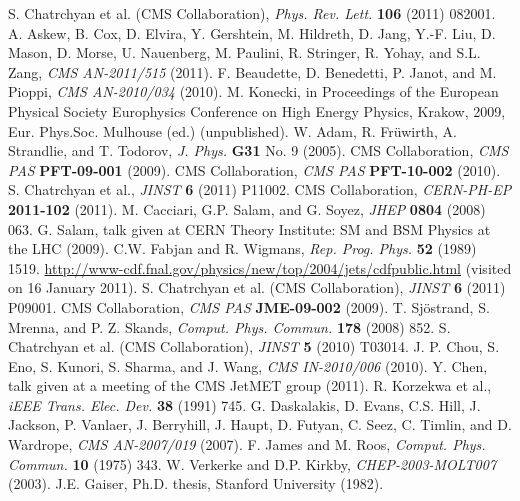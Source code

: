 \documentclass[12pt, letterpaper]{report}
\begin{document}
\begin{thebibliography}{99}
 S. Chatrchyan et al. (CMS Collaboration), \textit{Phys. Rev. Lett.} \textbf{106} (2011) 082001.
 A. Askew, B. Cox, D. Elvira, Y. Gershtein, M. Hildreth, D. Jang, Y.-F. Liu, D. Mason, D. Morse, U. Nauenberg, M. Paulini, R. Stringer, R. Yohay, and S.L. Zang, \textit{CMS AN-2011/515} (2011).
 F. Beaudette, D. Benedetti, P. Janot, and M. Pioppi, \textit{CMS AN-2010/034} (2010).
 M. Konecki, in Proceedings of the European Physical Society  Europhysics Conference on High Energy Physics, Krakow, 2009, Eur. Phys.Soc. Mulhouse (ed.) (unpublished).
 W. Adam, R. Fr\"uwirth, A. Strandlie, and T. Todorov, \textit{J. Phys.} \textbf{G31} No. 9 (2005).
 CMS Collaboration, \textit{CMS PAS} \textbf{PFT-09-001} (2009).
 CMS Collaboration, \textit{CMS PAS} \textbf{PFT-10-002} (2010).
 S. Chatrchyan et al., \textit{JINST} \textbf{6} (2011) P11002.
 CMS Collaboration, \textit{CERN-PH-EP} \textbf{2011-102} (2011).
 M. Cacciari, G.P. Salam, and G. Soyez, \textit{JHEP} \textbf{0804} (2008) 063.
 G. Salam, talk given at CERN Theory Institute: SM and BSM Physics at the LHC (2009).
 C.W. Fabjan and R. Wigmans, \textit{Rep. Prog. Phys.} \textbf{52} (1989) 1519.
 \url{http://www-cdf.fnal.gov/physics/new/top/2004/jets/cdfpublic.html} (visited on 16 January 2011).
 S. Chatrchyan et al. (CMS Collaboration), \textit{JINST} \textbf{6} (2011) P09001.
 CMS Collaboration, \textit{CMS PAS} \textbf{JME-09-002} (2009).
 T. Sj\"ostrand, S. Mrenna, and P. Z. Skands, \textit{Comput. Phys. Commun.} \textbf{178} (2008) 852.
 S. Chatrchyan et al. (CMS Collaboration), \textit{JINST} \textbf{5} (2010) T03014.
 J. P. Chou, S. Eno, S. Kunori, S. Sharma, and J. Wang, \textit{CMS IN-2010/006} (2010).
 Y. Chen, talk given at a meeting of the CMS JetMET group (2011).
 R. Korzekwa et al., \textit{iEEE Trans. Elec. Dev.} \textbf{38} (1991) 745.
 G. Daskalakis, D. Evans, C.S. Hill, J. Jackson, P. Vanlaer, J. Berryhill, J. Haupt, D. Futyan, C. Seez, C. Timlin, and D. Wardrope, \textit{CMS AN-2007/019} (2007).
 F. James and M. Roos, \textit{Comput. Phys. Commun.} \textbf{10} (1975) 343.
 W. Verkerke and D.P. Kirkby, \textit{CHEP-2003-MOLT007} (2003).
 J.E. Gaiser, Ph.D. thesis, Stanford University (1982).


\end{thebibliography}
\end{document}
